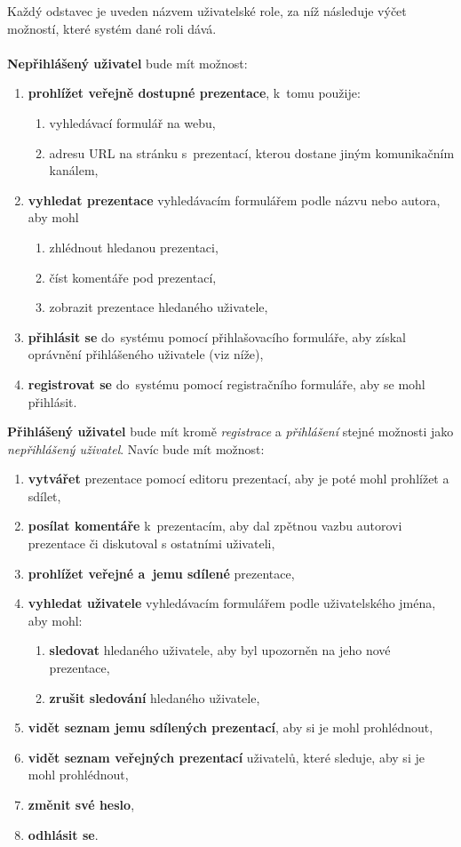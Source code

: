 \documentclass[11pt,twoside,a4paper]{book}
\begin{document}
Každý odstavec je uveden názvem uživatelské role, za níž následuje výčet možností, které systém dané roli dává. \\\\

\noindent \textbf{Nepřihlášený uživatel} bude mít možnost:
\begin{enumerate}
	\item \textbf{prohlížet veřejně dostupné prezentace}, k~tomu použije:
		\begin{enumerate}[label*=\arabic*.]
			\item vyhledávací formulář na webu,
			\item adresu URL na stránku s~prezentací, kterou dostane jiným komunikačním kanálem,
		\end{enumerate}
	\item \textbf{vyhledat prezentace} vyhledávacím formulářem podle názvu nebo autora, aby mohl
		\begin{enumerate}[label*=\arabic*.]
			\item zhlédnout hledanou prezentaci,
			\item číst komentáře pod prezentací,
			\item zobrazit prezentace hledaného uživatele,
		\end{enumerate}
	\item \textbf{přihlásit se} do~systému pomocí přihlašovacího formuláře, aby získal oprávnění přihlášeného uživatele (viz níže),
	\item \textbf{registrovat se} do~systému pomocí registračního formuláře, aby se mohl přihlásit.
\end{enumerate}


\noindent \textbf{Přihlášený uživatel} bude mít kromě \textit{registrace} a \textit{přihlášení} stejné možnosti jako \textit{nepřihlášený uživatel}. Navíc bude mít možnost:
\begin{enumerate}
	\item \textbf{vytvářet} prezentace pomocí editoru prezentací, aby je poté mohl prohlížet a sdílet,
	\item \textbf{posílat komentáře} k~prezentacím, aby dal zpětnou vazbu autorovi prezentace či diskutoval s ostatními uživateli,
	\item \textbf{prohlížet veřejné a~jemu sdílené} prezentace,
	\item \textbf{vyhledat uživatele} vyhledávacím formulářem podle uživatelského jména, aby mohl:
		\begin{enumerate}[label*=\arabic*.]
		\item \textbf{sledovat} hledaného uživatele, aby byl upozorněn na jeho nové prezentace,
		\item \textbf{zrušit sledování} hledaného uživatele,
		\end{enumerate}
	\item \textbf{vidět seznam jemu sdílených prezentací}, aby si je mohl prohlédnout,
	\item \textbf{vidět seznam veřejných prezentací} uživatelů, které sleduje, aby si je mohl prohlédnout,
	\item \textbf{změnit své heslo},
	\item \textbf{odhlásit se}.
\end{enumerate}
\end{document}
